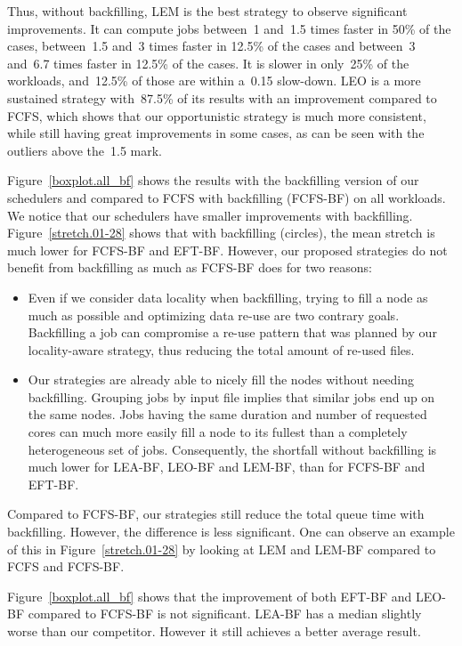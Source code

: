 \documentclass[sigconf,review,anonymous]{acmart}
\begin{document}
Thus, without backfilling, LEM is the best strategy to observe significant improvements.
It can compute jobs between~1 and~1.5 times faster in 50\% of the cases,
between~1.5 and~3 times faster in 12.5\% of the cases and between~3 and~6.7 times faster in 12.5\% of the cases.
It is slower in only~25\% of the workloads, and~12.5\% of those are within a~0.15 slow-down.
LEO is a more sustained strategy with~87.5\% of its results with an improvement compared to FCFS, which shows that our opportunistic
strategy is much more consistent, while still having great improvements in some cases, as can be seen with the outliers above the~1.5 mark.

Figure~\ref{boxplot.all_bf} shows the results with the backfilling version of our
schedulers and compared to FCFS with backfilling (FCFS-BF) on all workloads.
We  notice that our schedulers  have smaller improvements with backfilling.
Figure~\ref{stretch.01-28} shows that
with backfilling 
(circles),
the mean stretch is much lower for FCFS-BF and EFT-BF. 
However, our proposed strategies do not benefit from backfilling as much as FCFS-BF does for two reasons:
\begin{itemize}
	\item Even if we consider data locality when backfilling, trying to fill a node as much as possible and optimizing data re-use are two contrary goals. 
	Backfilling a job can compromise a re-use pattern that was planned by our locality-aware strategy, thus reducing the total 
	amount of re-used files.
	\item Our strategies are already able to nicely fill the nodes without needing backfilling.
	Grouping jobs by input file implies that similar jobs end up on the same nodes.
	Jobs having the same duration and number of requested cores can much more easily fill a node to its fullest than a completely heterogeneous set of jobs.
	Consequently, the shortfall without backfilling is much lower for LEA-BF, LEO-BF and LEM-BF, than for FCFS-BF and EFT-BF.
\end{itemize}
Compared to FCFS-BF, our strategies still reduce the total queue time with backfilling.
However, the difference is less significant. One can observe an example of this
in Figure~\ref{stretch.01-28} by looking at LEM and LEM-BF compared to FCFS and FCFS-BF.

Figure~\ref{boxplot.all_bf} shows that the improvement of both EFT-BF and LEO-BF compared to FCFS-BF is not significant.
LEA-BF has a median slightly worse than our competitor. However it still achieves a better average result.
\end{document}
